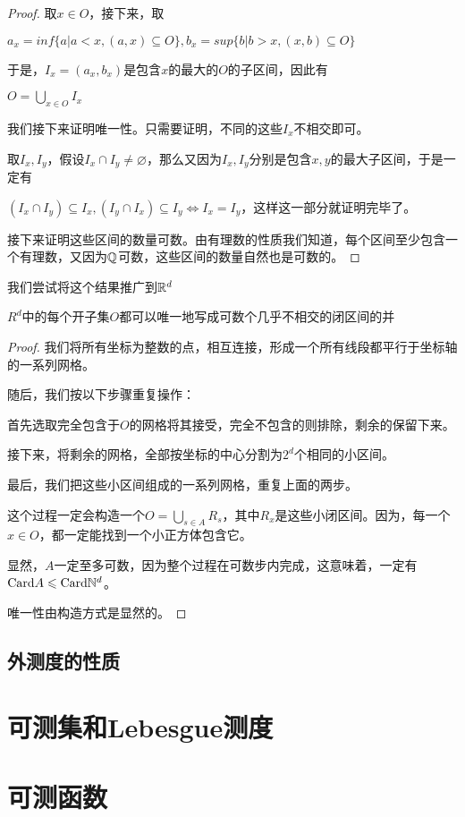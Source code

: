 \documentclass[12pt, a4paper, oneside, UTF8]{ctexbook}
\begin{document}
			\begin{proof}
				取$x \in O$，接下来，取
				
				$a_x = inf \{a| a<x,(a,x) \subseteq O\},b_x = sup \{b|b>x,(x,b) \subseteq O\}$
				
				于是，$I_x = (a_x,b_x)$是包含$x$的最大的$O$的子区间，因此有
				
				$O = \bigcup_{x \in O} I_x$
				
				我们接下来证明唯一性。只需要证明，不同的这些$I_x$不相交即可。
				
				取$I_x,I_y$，假设$I_x \cap I_y \neq \varnothing$，那么又因为$I_x,I_y$分别是包含$x,y$的最大子区间，于是一定有
				
				$(I_x \cap I_y) \subseteq I_x,(I_y \cap I_x) \subseteq I_y \Leftrightarrow I_x = I_y$，这样这一部分就证明完毕了。
				
				接下来证明这些区间的数量可数。由有理数的性质我们知道，每个区间至少包含一个有理数，又因为$\mathbb{Q}$可数，这些区间的数量自然也是可数的。
			\end{proof}
			我们尝试将这个结果推广到$\mathbb{R}^d$
			\begin{them}{}{}
				$R^d$中的每个开子集$O$都可以唯一地写成可数个几乎不相交的闭区间的并
			\end{them}
			\begin{proof}
				我们将所有坐标为整数的点，相互连接，形成一个所有线段都平行于坐标轴的一系列网格。
				
				随后，我们按以下步骤重复操作：
				
				首先选取完全包含于$O$的网格将其接受，完全不包含的则排除，剩余的保留下来。
				
				接下来，将剩余的网格，全部按坐标的中心分割为$2^d$个相同的小区间。
				
				最后，我们把这些小区间组成的一系列网格，重复上面的两步。
				
				这个过程一定会构造一个$O = \bigcup_{s \in A} R_s$，其中$R_x$是这些小闭区间。因为，每一个$x \in O$，都一定能找到一个小正方体包含它。
				
				显然，$A$一定至多可数，因为整个过程在可数步内完成，这意味着，一定有$\text{Card}A \leqslant \text{Card}\mathbb{N}^d$。
				
				唯一性由构造方式是显然的。
			\end{proof}
		\subsection{外测度的性质}
	\section{可测集和Lebesgue测度}
	\section{可测函数}
\ifx\allfiles\undefined
\end{document}
